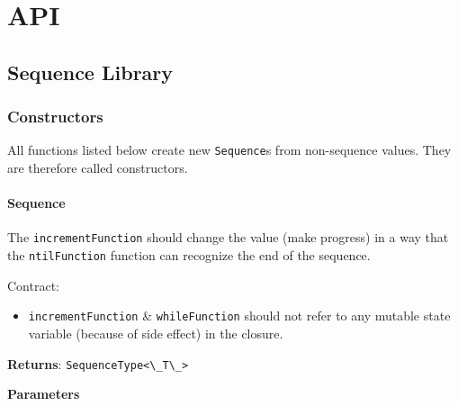 \chapter{API}
\label{chap:app_API}

\newcommand{\passthrough}[1]{#1}

\providecommand{\tightlist}{%
  \setlength{\itemsep}{0pt}\setlength{\parskip}{0pt}}

\hypertarget{api}{%
\section{Sequence Library}\label{api}}

\hypertarget{fa229d10-532a-4f04-9805-8fdc4881587a}{%
\subsection{Constructors}\label{sub:appendix_constructors} }

All functions listed below create new
\passthrough{\lstinline!Sequence!}s from non-sequence values. They are
therefore called constructors.

\hypertarget{6a313d03-9822-4a0c-a825-1a6a51264d55}{%
\subsubsection{Sequence}\label{6a313d03-9822-4a0c-a825-1a6a51264d55}}

The \passthrough{\lstinline!incrementFunction!} should change the value
(make progress) in a way that the \passthrough{\lstinline!ntilFunction!}
function can recognize the end of the sequence.

Contract:

\begin{itemize}
\tightlist
\item
  \passthrough{\lstinline!incrementFunction!} \&
  \passthrough{\lstinline!whileFunction!} should not refer to any
  mutable state variable (because of side effect) in the closure.
\end{itemize}

\textbf{Returns}: \passthrough{\lstinline!SequenceType<\_T\_>!}

\textbf{Parameters}

